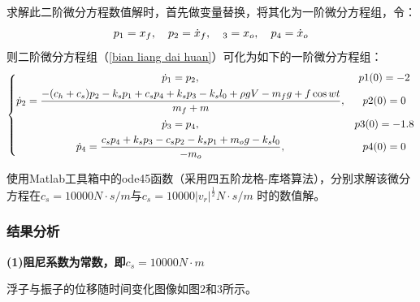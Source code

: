 \documentclass{my_paper}
\begin{document}
求解此二阶微分方程数值解时，首先做变量替换，将其化为一阶微分方程组，令：
\begin{equation}
        p_1=x_f,\quad p_2=\dot x_f,\quad_3=x_o,\quad p_4=\dot x_o\\
\end{equation}
则二阶微分方程组（\ref{bian liang dai huan}）可化为如下的一阶微分方程组：
\begin{equation}
    \left\{\begin{matrix} 

        \dot p_1=p_2, \vspace{1ex} & p1(0)=-2\\ 
        \displaystyle \dot p_2=\frac{-(c_h+c_s)p_{2}-k_s p_{1} + c_s p_{4}+k_s p_{3} - k_s l_{0}+\rho g V-m_{f}g+f \cos wt}{m_{f}+m}, \vspace{1ex} &p2(0) = 0\\  
        \dot p_3=p_4,\vspace{1ex} & p3(0)=-1.8\\
        \displaystyle\dot p_4=\frac{c_{s} p_{4}+k_{s} p_{3}-c_{s} p_{2}-k_{s} p_{1}+m_{o}g-k_{s} l_{0}}{-m_{o}}, & p4(0)=0\\
  \end{matrix}\right.    
\end{equation}

使用Matlab工具箱中的ode45函数（采用四五阶龙格-库塔算法）\cite{司守奎2007数学建模算法与程序}，分别求解该微分方程在$c_{s}=10000N\cdot s/m$与$c_{s}=10000 \lvert v_{r} \rvert^\frac{1}{2}N\cdot s/m$
时的数值解。
\subsubsection{结果分析}

\noindent
\textbf{(1)阻尼系数为常数，即$c_s=10000N\cdot m$}

浮子与振子的位移随时间变化图像如图2和3所示。
\newpage
\end{document}
